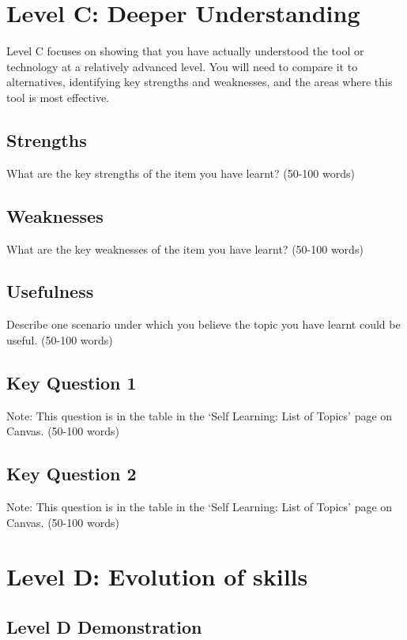 \documentclass[a4paper, 11pt]{report}
\begin{document}
\newpage
\section{Level C: Deeper Understanding}

Level C focuses on showing that you have actually understood the tool or technology at a relatively advanced level. You will need to compare it to alternatives, identifying key strengths and weaknesses, and the areas where this tool is most effective. 

\subsection{Strengths}
What are the key strengths of the item you have learnt? (50-100 words)

\subsection{Weaknesses}
What are the key weaknesses of the item you have learnt? (50-100 words)

\subsection{Usefulness}
Describe one scenario under which you believe the topic you have learnt could be useful. (50-100 words)

\subsection{Key Question 1}
Note: This question is in the table in the ‘Self Learning: List of Topics’ page on Canvas. (50-100 words)

\subsection{Key Question 2}
Note: This question is in the table in the ‘Self Learning: List of Topics’ page on Canvas. (50-100 words)



\newpage
\section{Level D: Evolution of skills}
\vspace{5mm}
\subsection{Level D Demonstration}
\end{document}
